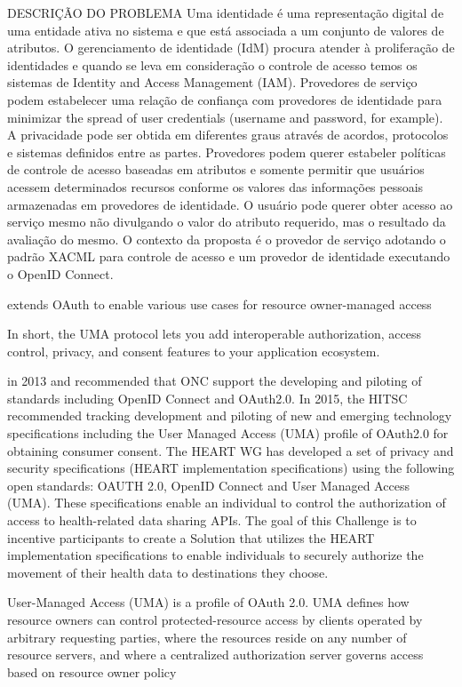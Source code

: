 DESCRIÇÃO DO PROBLEMA
Uma identidade é uma representação digital de uma entidade ativa no sistema e que está associada a um conjunto de valores de atributos. O gerenciamento de identidade (IdM) procura atender à proliferação de identidades e quando se leva em consideração o controle de acesso temos os sistemas de Identity and Access Management (IAM). Provedores de serviço podem estabelecer uma relação de confiança com provedores de identidade para minimizar the spread of user credentials (username and password, for example). A privacidade pode ser obtida em diferentes graus através de acordos, protocolos e sistemas definidos entre as partes. Provedores podem querer estabeler políticas de controle de acesso baseadas em atributos e somente permitir que usuários acessem determinados recursos conforme os valores das informações pessoais armazenadas em provedores de identidade. O usuário pode querer obter acesso ao serviço mesmo não divulgando o valor do atributo requerido, mas o resultado da avaliação do mesmo. O contexto da proposta é o provedor de serviço adotando o padrão XACML para controle de acesso e um provedor de identidade executando o OpenID Connect.


extends OAuth to enable various use cases for resource owner-managed access 

In short, the UMA protocol lets you add interoperable authorization, access control, privacy, and consent features to your application ecosystem.

in 2013 and recommended that ONC support the developing and piloting of standards including OpenID Connect and OAuth2.0. In 2015, the HITSC recommended tracking development and piloting of new and emerging technology specifications including the User Managed Access (UMA) profile of OAuth2.0 for obtaining consumer consent. The HEART WG has developed a set of privacy and security specifications (HEART implementation specifications) using the following open standards: OAUTH 2.0, OpenID Connect and User Managed Access (UMA). These specifications enable an individual to control the authorization of access to health-related data sharing APIs. The goal of this Challenge is to incentive participants to create a Solution that utilizes the HEART implementation specifications to enable individuals to securely authorize the movement of their health data to destinations they choose. 


User-Managed Access (UMA) is a profile of OAuth 2.0. UMA defines how resource owners can control protected-resource access by clients operated by arbitrary requesting parties, where the resources reside on any number of resource servers, and where a centralized authorization server governs access based on resource owner policy


